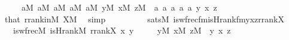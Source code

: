 \begin{isabellebody}
\ \ \ \ \ {\isachardoublequoteopen}a{}{\isasymin}M{\isachardoublequoteclose}\ {\isachardoublequoteopen}a{}{\isasymin}M{\isachardoublequoteclose}\ {\isachardoublequoteopen}a{}{\isasymin}M{\isachardoublequoteclose}\ {\isachardoublequoteopen}a{}{\isasymin}M{\isachardoublequoteclose}\ {\isachardoublequoteopen}a{}{\isasymin}M{\isachardoublequoteclose}\ {\isachardoublequoteopen}y{\isasymin}M{\isachardoublequoteclose}\ {\isachardoublequoteopen}x{\isasymin}M{\isachardoublequoteclose}\ {\isachardoublequoteopen}z{\isasymin}M{\isachardoublequoteclose}\ \ a{}\ a{}\ a{}\ a{}\ a{}\ y\ x\ z\isanewline
\ \ \ \ \isamarkupfalse%
\ that\ rrank{\isacharunderscore}{\kern0pt}in{\isacharunderscore}{\kern0pt}M\ {\isacartoucheopen}X{\isasymin}M{\isacartoucheclose}\ \isamarkupfalse%
\ simp\isanewline
\ \ \isamarkupfalse%
\isanewline
\ \ \isamarkupfalse%
\isanewline
\ \ \ \ {}{\isacharcolon}{\kern0pt}{\isachardoublequoteopen}sats{\isacharparenleft}{\kern0pt}M{\isacharcomma}{\kern0pt}\ is{\isacharunderscore}{\kern0pt}wfrec{\isacharunderscore}{\kern0pt}fm{\isacharparenleft}{\kern0pt}is{\isacharunderscore}{\kern0pt}Hrank{\isacharunderscore}{\kern0pt}fm{\isacharparenleft}{\kern0pt}{}{\isacharcomma}{\kern0pt}{}{\isacharcomma}{\kern0pt}{}{\isacharparenright}{\kern0pt}{\isacharcomma}{\kern0pt}{}{\isacharcomma}{\kern0pt}{}{\isacharcomma}{\kern0pt}{}{\isacharparenright}{\kern0pt}{\isacharcomma}{\kern0pt}{\isacharbrackleft}{\kern0pt}y{\isacharcomma}{\kern0pt}x{\isacharcomma}{\kern0pt}z{\isacharcomma}{\kern0pt}rrank{\isacharparenleft}{\kern0pt}X{\isacharparenright}{\kern0pt}{\isacharbrackright}{\kern0pt}{\isacharparenright}{\kern0pt}\isanewline
\ \ {\isasymlongleftrightarrow}\ is{\isacharunderscore}{\kern0pt}wfrec{\isacharparenleft}{\kern0pt}{\isacharhash}{\kern0pt}{\isacharhash}{\kern0pt}M{\isacharcomma}{\kern0pt}\ is{\isacharunderscore}{\kern0pt}Hrank{\isacharparenleft}{\kern0pt}{\isacharhash}{\kern0pt}{\isacharhash}{\kern0pt}M{\isacharparenright}{\kern0pt}\ {\isacharcomma}{\kern0pt}rrank{\isacharparenleft}{\kern0pt}X{\isacharparenright}{\kern0pt}{\isacharcomma}{\kern0pt}\ x{\isacharcomma}{\kern0pt}\ y{\isacharparenright}{\kern0pt}{\isachardoublequoteclose}\isanewline
\ \ \ \ \ {\isachardoublequoteopen}y{\isasymin}M{\isachardoublequoteclose}\ {\isachardoublequoteopen}x{\isasymin}M{\isachardoublequoteclose}\ {\isachardoublequoteopen}z{\isasymin}M{\isachardoublequoteclose}\ \ y\ x\ z\isanewline

\end{isabellebody}
